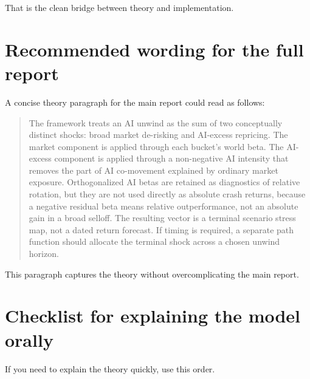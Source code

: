 \documentclass[10pt]{article}
\begin{document}
That is the clean bridge between theory and implementation.

\section{Recommended wording for the full report}

A concise theory paragraph for the main report could read as follows:

\begin{quote}
The framework treats an AI unwind as the sum of two conceptually distinct shocks: broad market de-risking and AI-excess repricing. The market component is applied through each bucket's world beta. The AI-excess component is applied through a non-negative AI intensity that removes the part of AI co-movement explained by ordinary market exposure. Orthogonalized AI betas are retained as diagnostics of relative rotation, but they are not used directly as absolute crash returns, because a negative residual beta means relative outperformance, not an absolute gain in a broad selloff. The resulting vector is a terminal scenario stress map, not a dated return forecast. If timing is required, a separate path function should allocate the terminal shock across a chosen unwind horizon.
\end{quote}

This paragraph captures the theory without overcomplicating the main report.

\section{Checklist for explaining the model orally}

If you need to explain the theory quickly, use this order.
\end{document}
